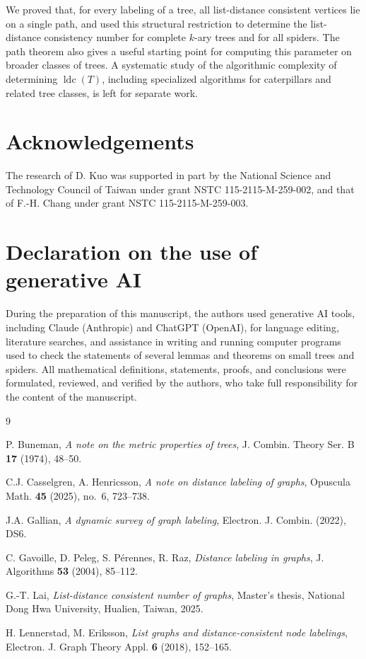 \documentclass[reqno,10pt]{article}
\theoremstyle{definition}
\numberwithin{equation}{section}
\numberwithin{theorem}{section}
\newcommand{\ldc}{\operatorname{ldc}}
\begin{document}
We proved that, for every labeling of a tree, all list-distance consistent vertices lie on a single path,
and used this structural restriction to determine the list-distance consistency number for complete $k$-ary trees
and for all spiders. The path theorem also gives a useful starting point for
computing this parameter on broader classes of trees. A systematic study of
the algorithmic complexity of determining $\ldc(T)$, including specialized
algorithms for caterpillars and related tree classes, is left for separate
work.

\section*{Acknowledgements}

The research of D. Kuo was supported in part by the National Science and
Technology Council of Taiwan under grant NSTC 115-2115-M-259-002, and
that of F.-H. Chang under grant NSTC 115-2115-M-259-003.
\clearpage
\section*{Declaration on the use of generative AI}

During the preparation of this manuscript, the authors used generative AI
tools, including Claude (Anthropic) and ChatGPT (OpenAI), for language editing,
literature searches, and assistance in writing and running computer programs
used to check the statements of several lemmas and theorems on small trees and
spiders. All mathematical definitions, statements, proofs, and conclusions
were formulated, reviewed, and verified by the authors, who take full
responsibility for the content of the manuscript.

\begin{thebibliography}{9}

P. Buneman,
\emph{A note on the metric properties of trees},
J. Combin. Theory Ser. B \textbf{17} (1974), 48--50.

C.J. Casselgren, A. Henricsson,
\emph{A note on distance labeling of graphs},
Opuscula Math. \textbf{45} (2025), no.~6, 723--738.

J.A. Gallian,
\emph{A dynamic survey of graph labeling},
Electron. J. Combin. (2022), DS6.

C. Gavoille, D. Peleg, S. P\'erennes, R. Raz,
\emph{Distance labeling in graphs},
J. Algorithms \textbf{53} (2004), 85--112.

G.-T. Lai,
\emph{List-distance consistent number of graphs},
Master's thesis, National Dong Hwa University, Hualien, Taiwan, 2025.

H. Lennerstad, M. Eriksson,
\emph{List graphs and distance-consistent node labelings},
Electron. J. Graph Theory Appl. \textbf{6} (2018), 152--165.

\end{thebibliography}
\end{document}
